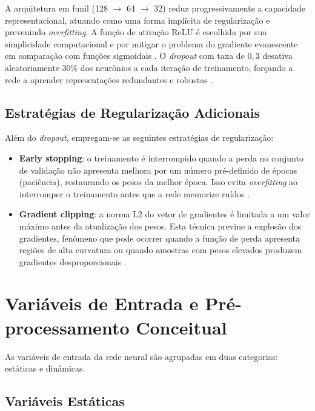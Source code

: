 A arquitetura em funil (128 $\rightarrow$ 64 $\rightarrow$ 32) reduz progressivamente a capacidade representacional, atuando como uma forma implícita de regularização e prevenindo \textit{overfitting}. A função de ativação \ac{ReLU} é escolhida por sua simplicidade computacional e por mitigar o problema do gradiente evanescente em comparação com funções sigmoidais \cite{goodfellow2016deep}. O \textit{dropout} com taxa de \(0,3\) desativa aleatoriamente \(30\%\) dos neurônios a cada iteração de treinamento, forçando a rede a aprender representações redundantes e robustas \cite{srivastava2014dropout}.

\subsection{Estratégias de Regularização Adicionais}

Além do \textit{dropout}, empregam-se as seguintes estratégias de regularização:

\begin{itemize}
    \item \textbf{Early stopping}: o treinamento é interrompido quando a perda no conjunto de validação não apresenta melhora por um número pré-definido de épocas (paciência), restaurando os pesos da melhor época. Isso evita \textit{overfitting} ao interromper o treinamento antes que a rede memorize ruídos \cite{goodfellow2016deep}.

    \item \textbf{Gradient clipping}: a norma L2 do vetor de gradientes é limitada a um valor máximo antes da atualização dos pesos. Esta técnica previne a explosão dos gradientes, fenômeno que pode ocorrer quando a função de perda apresenta regiões de alta curvatura ou quando amostras com pesos elevados produzem gradientes desproporcionais \cite{goodfellow2016deep}.
\end{itemize}

\section{Variáveis de Entrada e Pré-processamento Conceitual}

As variáveis de entrada da rede neural são agrupadas em duas categorias: estáticas e dinâmicas.

\subsection{Variáveis Estáticas}

